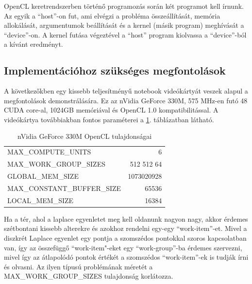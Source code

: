 	
	OpenCL keretrendszerben történő programozás során két programot kell írnunk.
	Az egyik a ``host''-on fut, ami elvégzi a probléma összeállítását, memória
	allokálását, argumentumok beállítását és a kernel (másik program) meghívását a
	``device''-on.
	A kernel futása végeztével a ``host'' program kiolvassa a ``device''-ból
	a kívánt eredményt.
	
\subsection{Implementációhoz szükséges megfontolások}
	
	A következőkben egy kissebb teljesítményű notebook videókártyát veszek
	alapul a megfontolások demonstrálására. Ez az nVidia GeForce 330M, 
	575 MHz-en futó 48 CUDA core-al, 1024GB memóriával és
	OpenCL 1.0 kompatibilitással.
	A videókártya továbbiakban fontos paraméterei a \ref{table:vcard}. táblázatban
	látható.
	
	\begin{table}[!h]
	\renewcommand{\arraystretch}{1.3}
	\caption{\scriptsize nVidia GeForce 330M OpenCL tulajdonságai}
	\label{table:vcard}
	\centering
	\begin{tabular}{l|r}
		MAX\_COMPUTE\_UNITS & 6\\
		MAX\_WORK\_GROUP\_SIZES & 512 512 64\\
		GLOBAL\_MEM\_SIZE & 1073020928\\
		MAX\_CONSTANT\_BUFFER\_SIZE & 65536\\
		LOCAL\_MEM\_SIZE & 16384
	\end{tabular}
	\end{table}
	
	
	
	Ha a tér, ahol a laplace egyenletet meg kell oldanunk nagyon nagy, akkor
	érdemes szétbontani kissebb alterekre és azokhoz rendelni egy-egy
	``work-item''-et. Mivel a diszkrét Laplace egyenlet egy pontja a szomszédos
	pontokkal szoros kapcsolatban van, így az összefüggő ``work-item"-eket egy
	``work-group''-ba érdemes szervezni, mivel így az átlapolódó pontok értékét a
	szomszédos ``work-item''-ek is tudják írni és olvasni. Az ilyen típusú
	problémának méretét a MAX\_WORK\_GROUP\_SIZES tulajdonság korlátozza.
	
